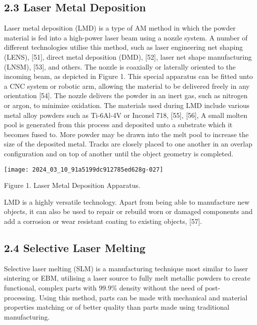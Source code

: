 \documentclass[10pt]{article}
\begin{document}
\subsection*{2.3 Laser Metal Deposition}
Laser metal deposition (LMD) is a type of AM method in which the powder material is fed into a high-power laser beam using a nozzle system. A number of different technologies utilise this method, such as laser engineering net shaping (LENS), [51], direct metal deposition (DMD), [52], laser net shape manufacturing (LNSM), [53], and others. The nozzle is coaxially or laterally oriented to the incoming beam, as depicted in Figure 1. This special apparatus can be fitted unto a CNC system or robotic arm, allowing the material to be delivered freely in any orientation [54]. The nozzle delivers the powder in an inert gas, such as nitrogen or argon, to minimize oxidation. The materials used during LMD include various metal alloy powders such as Ti-6Al-4V or Inconel 718, [55], [56], A small molten pool is generated from this process and deposited unto a substrate which it becomes fused to. More powder may be drawn into the melt pool to increase the size of the deposited metal. Tracks are closely placed to one another in an overlap configuration and on top of another until the object geometry is completed.

\begin{center}
\texttt{[image: 2024\_03\_10\_91a5199dc912785ed628g-027]}
\end{center}

Figure 1. Laser Metal Deposition Apparatus.

LMD is a highly versatile technology. Apart from being able to manufacture new objects, it can also be used to repair or rebuild worn or damaged components and add a corrosion or wear resistant coating to existing objects, [57].

\subsection*{2.4 Selective Laser Melting}
Selective laser melting (SLM) is a manufacturing technique most similar to laser sintering or EBM, utilising a laser source to fully melt metallic powders to create functional, complex parts with $99.9 \%$ density without the need of post-processing. Using this method, parts can be made with mechanical and material properties matching or of better quality than parts made using traditional manufacturing.
\end{document}
